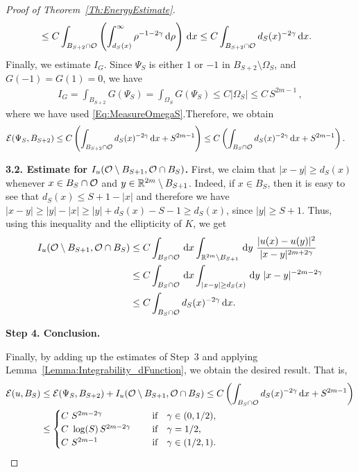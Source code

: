 \begin{proof}[Proof of Theorem~\ref{Th:EnergyEstimate}]
\begin{align*}
&\leq C \int_{B_{S+2} \cap \mathcal{O}} \left(\int_{d_S(x)}^\infty \rho^{-1-2\gamma} \,\mathrm{d} \rho \right)\,\mathrm{d} x \leq C \int_{B_{S+2} \cap \mathcal{O}} d_S(x)^{-2\gamma} \,\mathrm{d} x.
\end{align*}
Finally, we estimate $I_G$. Since $\Psi_S$ is either $1$ or $-1$ in $B_{S+2}\setminus \Omega_S$, and $G(-1)=G(1)=0$, we have
\begin{align*}
I_G = \int_{B_{S+2}} G(\Psi_S) = \int_{\Omega_S} G(\Psi_S) \leq C | \Omega_S| \leq C\,S^{2m-1}\,,
\end{align*}
where we have used \eqref{Eq:MeasureOmegaS}.Therefore, we obtain
\begin{align*}
\mathcal{E}(\Psi_S,B_{S+2}) &\leq C \left(\int_{B_{S+2} \cap \mathcal{O}} d_S(x)^{-2\gamma} \,\mathrm{d} x + S^{2m-1} \right)\leq C\left(\int_{B_{S} \cap \mathcal{O}} d_S(x)^{-2\gamma} \,\mathrm{d} x + S^{2m-1} \right).
\end{align*}


\textbf{3.2. Estimate for $I_u(\mathcal{O} \setminus B_{S+1}, \mathcal{O} \cap B_S)$.} First, we claim that $|x-y|\geq d_S(x)$ whenever $x\in B_S\cap \mathcal{O}$ and $y\in \mathbb{R}^{2m}\setminus B_{S+1}$. Indeed, if $x\in B_S$, then it is easy to see that $d_S(x) \leq S+1-|x|$ and therefore we have $|x-y|\geq |y|-|x|\geq |y|+d_S(x)-S-1 \geq  d_S(x)$, since $|y| \geq S+1$. Thus, using this inequality and the ellipticity of $K$, we get
\begin{align*}
I_u(\ocal \setminus B_{S+1}, \ocal \cap B_S) &\leq C \int_{B_S \cap \ocal} \d x \int_{\R^{2m}\setminus B_{S+1}} \d y \ \frac{|u(x)-u(y)|^2}{|x-y|^{2m+2\s}} \\
& \leq C \int_{B_S \cap \ocal} \d x \int_{|x-y|\geq d_S(x)} \d y \ |x-y|^{-2m-2\s} \\
&\leq C \int_{B_S \cap \ocal} d_S(x)^{-2\s} \d x.
\end{align*}

\textbf{Step 4. Conclusion.}

Finally, by adding up the estimates of Step~3 and applying Lemma~\ref{Lemma:Integrability_dFunction}, we obtain the desired result. That is,
\begin{align*}
\mathcal{E}(u,B_S) &\leq \mathcal{E}(\Psi_S,B_{S+2}) + I_u(\mathcal{O} \setminus B_{S+1}, \mathcal{O} \cap B_S) \leq C\left(\int_{B_S \cap \mathcal{O}} d_S(x)^{-2\gamma} \,\mathrm{d} x + S^{2m-1} \right)\\
&\leq \begin{cases}
C \ S^{2m-2\gamma}\ \ \ &\textrm{if } \ \ \gamma\in(0,1/2),\\
C\ \log(S)\,S^{2m-2\gamma}\ \ \ \ &\textrm{if } \ \ \gamma=1/2,\\
C \ S^{2m-1}\ \ \ \ &\textrm{if } \ \ \gamma\in(1/2,1).\\
\end{cases}
\end{align*}
\end{proof}
